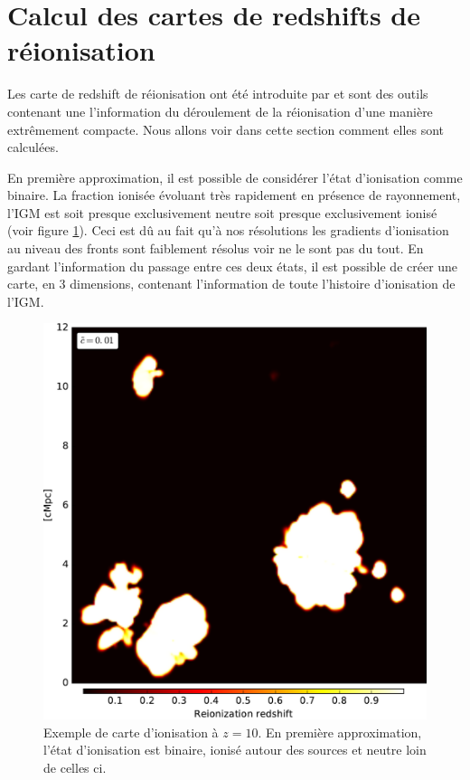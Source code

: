 

\section{Calcul des cartes de redshifts de réionisation}
\label{sec:zmapcompute}

Les carte de redshift de réionisation ont été introduite par \cite{2008ApJ...689L..81T} et sont des outils contenant une l'information du déroulement de la réionisation d'une manière extrêmement compacte.
Nous allons voir dans cette section comment elles sont calculées.

En première approximation, il est possible de considérer l'état d'ionisation comme binaire.
La fraction ionisée évoluant très rapidement en présence de rayonnement, l'\ac{IGM} est soit presque exclusivement neutre soit presque exclusivement ionisé (voir figure \ref{fig:xionmap}).
Ceci est dû au fait qu'à nos résolutions les gradients d'ionisation au niveau des fronts sont faiblement résolus voir ne le sont pas du tout.
En gardant l'information du passage entre ces deux états, il est possible de créer une carte, en 3 dimensions, contenant l’information de toute l'histoire d'ionisation de l'\ac{IGM}.


\begin{figure}
        \includegraphics[width=.95\linewidth]{img/04_mapreio/xion_map.pdf} 
        \caption[Carte d'ionisation]{Exemple de carte d'ionisation à $z=10$.
        En première approximation, l'état d'ionisation est binaire, ionisé autour des sources et neutre loin de celles ci.
 		\label{fig:xionmap}}
\end{figure}


